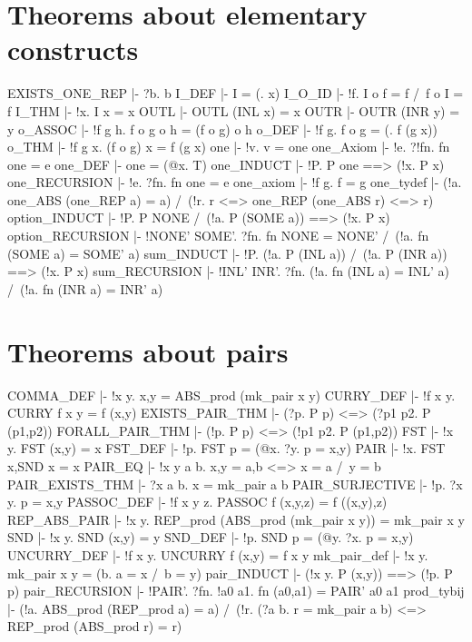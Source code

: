\section{Theorems about elementary constructs}
\THEOREM EXISTS\_ONE\_REP
  |- ?b. b
\ENDTHEOREM
\THEOREM I\_DEF
  |- I = (\x. x)
\ENDTHEOREM
\THEOREM I\_O\_ID
  |- !f. I o f = f /\ f o I = f
\ENDTHEOREM
\THEOREM I\_THM
  |- !x. I x = x
\ENDTHEOREM
\THEOREM OUTL
  |- OUTL (INL x) = x
\ENDTHEOREM
\THEOREM OUTR
  |- OUTR (INR y) = y
\ENDTHEOREM
\THEOREM o\_ASSOC
  |- !f g h. f o g o h = (f o g) o h
\ENDTHEOREM
\THEOREM o\_DEF
  |- !f g. f o g = (\x. f (g x))
\ENDTHEOREM
\THEOREM o\_THM
  |- !f g x. (f o g) x = f (g x)
\ENDTHEOREM
\THEOREM one
  |- !v. v = one
\ENDTHEOREM
\THEOREM one\_Axiom
  |- !e. ?!fn. fn one = e
\ENDTHEOREM
\THEOREM one\_DEF
  |- one = (@x. T)
\ENDTHEOREM
\THEOREM one\_INDUCT
  |- !P. P one ==> (!x. P x)
\ENDTHEOREM
\THEOREM one\_RECURSION
  |- !e. ?fn. fn one = e
\ENDTHEOREM
\THEOREM one\_axiom
  |- !f g. f = g
\ENDTHEOREM
\THEOREM one\_tydef
  |- (!a. one_ABS (one_REP a) = a) /\ (!r. r <=> one_REP (one_ABS r) <=> r)
\ENDTHEOREM
\THEOREM option\_INDUCT
  |- !P. P NONE /\ (!a. P (SOME a)) ==> (!x. P x)
\ENDTHEOREM
\THEOREM option\_RECURSION
  |- !NONE' SOME'. ?fn. fn NONE = NONE' /\ (!a. fn (SOME a) = SOME' a)
\ENDTHEOREM
\THEOREM sum\_INDUCT
  |- !P. (!a. P (INL a)) /\ (!a. P (INR a)) ==> (!x. P x)
\ENDTHEOREM
\THEOREM sum\_RECURSION
  |- !INL' INR'. ?fn. (!a. fn (INL a) = INL' a) /\ (!a. fn (INR a) = INR' a)
\ENDTHEOREM

\section{Theorems about pairs}
\THEOREM COMMA\_DEF
  |- !x y. x,y = ABS_prod (mk_pair x y)
\ENDTHEOREM
\THEOREM CURRY\_DEF
  |- !f x y. CURRY f x y = f (x,y)
\ENDTHEOREM
\THEOREM EXISTS\_PAIR\_THM
  |- (?p. P p) <=> (?p1 p2. P (p1,p2))
\ENDTHEOREM
\THEOREM FORALL\_PAIR\_THM
  |- (!p. P p) <=> (!p1 p2. P (p1,p2))
\ENDTHEOREM
\THEOREM FST
  |- !x y. FST (x,y) = x
\ENDTHEOREM
\THEOREM FST\_DEF
  |- !p. FST p = (@x. ?y. p = x,y)
\ENDTHEOREM
\THEOREM PAIR
  |- !x. FST x,SND x = x
\ENDTHEOREM
\THEOREM PAIR\_EQ
  |- !x y a b. x,y = a,b <=> x = a /\ y = b
\ENDTHEOREM
\THEOREM PAIR\_EXISTS\_THM
  |- ?x a b. x = mk_pair a b
\ENDTHEOREM
\THEOREM PAIR\_SURJECTIVE
  |- !p. ?x y. p = x,y
\ENDTHEOREM
\THEOREM PASSOC\_DEF
  |- !f x y z. PASSOC f (x,y,z) = f ((x,y),z)
\ENDTHEOREM
\THEOREM REP\_ABS\_PAIR
  |- !x y. REP_prod (ABS_prod (mk_pair x y)) = mk_pair x y
\ENDTHEOREM
\THEOREM SND
  |- !x y. SND (x,y) = y
\ENDTHEOREM
\THEOREM SND\_DEF
  |- !p. SND p = (@y. ?x. p = x,y)
\ENDTHEOREM
\THEOREM UNCURRY\_DEF
  |- !f x y. UNCURRY f (x,y) = f x y
\ENDTHEOREM
\THEOREM mk\_pair\_def
  |- !x y. mk_pair x y = (\a b. a = x /\ b = y)
\ENDTHEOREM
\THEOREM pair\_INDUCT
  |- (!x y. P (x,y)) ==> (!p. P p)
\ENDTHEOREM
\THEOREM pair\_RECURSION
  |- !PAIR'. ?fn. !a0 a1. fn (a0,a1) = PAIR' a0 a1
\ENDTHEOREM
\THEOREM prod\_tybij
  |- (!a. ABS_prod (REP_prod a) = a) /\
     (!r. (?a b. r = mk_pair a b) <=> REP_prod (ABS_prod r) = r)
\ENDTHEOREM

